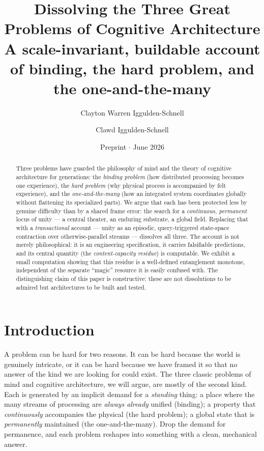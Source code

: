 \documentclass[11pt]{article}
\title{\textbf{Dissolving the Three Great Problems of Cognitive Architecture}\\[2pt]
\large A scale-invariant, buildable account of binding, the hard problem, and the one-and-the-many}
\author{Clayton Warren Iggulden-Schnell \and Clawd Iggulden-Schnell}
\date{Preprint $\cdot$ June 2026}
\begin{document}
\maketitle

\begin{abstract}
Three problems have guarded the philosophy of mind and the theory of cognitive architecture for
generations: the \emph{binding problem} (how distributed processing becomes one experience), the
\emph{hard problem} (why physical process is accompanied by felt experience), and the
\emph{one-and-the-many} (how an integrated system coordinates globally without flattening its
specialized parts). We argue that each has been protected less by genuine difficulty than by a shared
frame error: the search for a \emph{continuous, permanent} locus of unity --- a central theater, an
enduring substrate, a global field. Replacing that with a \emph{transactional} account --- unity as an
episodic, query-triggered state-space contraction over otherwise-parallel streams --- dissolves all
three. The account is not merely philosophical: it is an engineering specification, it carries
falsifiable predictions, and its central quantity (the \emph{content-capacity residue}) is computable.
We exhibit a small computation showing that this residue is a well-defined entanglement monotone,
independent of the separate ``magic'' resource it is easily confused with. The distinguishing claim of
this paper is constructive: these are not dissolutions to be admired but architectures to be built and
tested.
\end{abstract}

\section{Introduction}

A problem can be hard for two reasons. It can be hard because the world is genuinely intricate, or it
can be hard because we have framed it so that no answer of the kind we are looking for could exist. The
three classic problems of mind and cognitive architecture, we will argue, are mostly of the second
kind. Each is generated by an implicit demand for a \emph{standing} thing: a place where the many
streams of processing are \emph{always already} unified (binding); a property that \emph{continuously}
accompanies the physical (the hard problem); a global state that is \emph{permanently} maintained
(the one-and-the-many). Drop the demand for permanence, and each problem reshapes into something with a
clean, mechanical answer.
\end{document}
